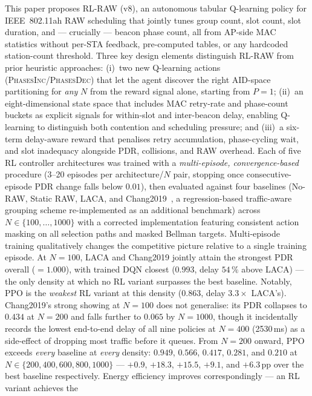 \documentclass[conference]{IEEEtran}
\begin{document}
This paper proposes RL-RAW (v8), an autonomous tabular Q-learning policy
for IEEE~802.11ah RAW scheduling that jointly tunes group count, slot count,
slot duration, and — crucially — beacon phase count, all from AP-side MAC
statistics without per-STA feedback, pre-computed tables, or any hardcoded
station-count threshold.
Three key design elements distinguish RL-RAW from prior heuristic approaches:
(i)~two new Q-learning actions (\textsc{PhasesInc}/\textsc{PhasesDec}) that
let the agent discover the right AID-space partitioning for \emph{any} $N$
from the reward signal alone, starting from $P = 1$;
(ii)~an eight-dimensional state space that includes MAC retry-rate and
phase-count buckets as explicit signals for within-slot and
inter-beacon delay, enabling Q-learning to distinguish both contention
and scheduling pressure; and
(iii)~a six-term delay-aware reward that penalises retry accumulation,
phase-cycling wait, and slot inadequacy alongside PDR, collisions,
and RAW overhead.
Each of five RL controller architectures was trained with a
\emph{multi-episode, convergence-based} procedure (3--20 episodes per
architecture/$N$ pair, stopping once consecutive-episode PDR change falls
below $0.01$), then evaluated against four baselines (No-RAW, Static RAW,
LACA, and Chang2019~\cite{chang2019traffic}, a regression-based
traffic-aware grouping scheme re-implemented as an additional benchmark)
across $N \in \{100, \ldots, 1000\}$ with a corrected implementation
featuring consistent action masking on all selection paths and masked
Bellman targets.
Multi-episode training qualitatively changes the competitive picture
relative to a single training episode.
At $N=100$, LACA and Chang2019 jointly attain the strongest PDR overall
($=1.000$), with trained DQN closest ($0.993$, delay $54\,\%$ above LACA)
— the only density at which no RL variant surpasses the best baseline.
Notably, PPO is the \emph{weakest} RL variant at this density ($0.863$,
delay $3.3\times$ LACA's).
Chang2019's strong showing at $N=100$ does not generalise: its PDR
collapses to $0.434$ at $N=200$ and falls further to $0.065$ by $N=1000$,
though it incidentally records the lowest end-to-end delay of all nine
policies at $N=400$ (2530\,ms) as a side-effect of dropping most traffic
before it queues.
From $N=200$ onward, PPO exceeds \emph{every} baseline at \emph{every}
density: $0.949$, $0.566$, $0.417$, $0.281$, and $0.210$ at
$N\in\{200,400,600,800,1000\}$ — $+0.9$, $+18.3$, $+15.5$, $+9.1$, and
$+6.3$\,pp over the best baseline respectively.
Energy efficiency improves correspondingly — an RL variant achieves the
\end{document}
